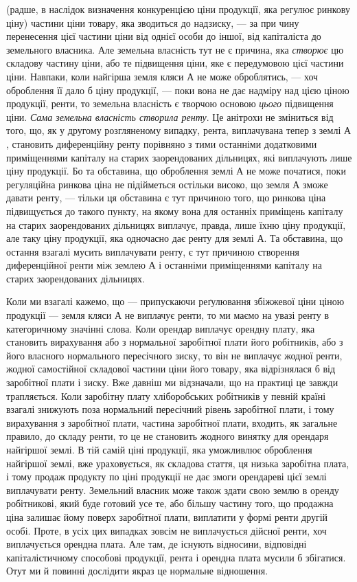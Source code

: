 \parcont{}  %
(радше, в наслідок визначення конкуренцією ціни продукції, яка регулює ринкову
ціну) частини ціни товару, яка зводиться до надзиску, — за при чину перенесення
цієї частини ціни від однієї особи до іншої, від капіталіста до
земельного власника. Але земельна власність тут не є причина, яка \emph{створює}
цю складову частину ціни, або те підвищення ціни, яке є передумовою цієї
частини ціни. Навпаки, коли найгірша земля кляси $А$ не може оброблятись, —
хоч оброблення її дало б ціну продукції, — поки вона не дає надміру над цією
ціною продукції, ренти, то земельна власність є творчою основою \emph{цього} підвищення
ціни. \emph{Сама земельна власність створила ренту}. Це анітрохи не
зміниться від того, що, як у другому розгляненому випадку, рента, виплачувана
тепер з землі $А$, становить диференційну ренту порівняно з тими останніми
додатковими приміщеннями капіталу на старих заорендованих дільницях, які
виплачують лише ціну продукції. Бо та обставина, що оброблення землі $А$
не може початися, поки регуляційна ринкова ціна не підійметься остільки високо,
що земля $А$ зможе давати ренту, — тільки ця обставина є тут причиною
того, що ринкова ціна підвищується до такого пункту, на якому вона для
останніх приміщень капіталу на старих заорендованих дільницях виплачує,
правда, лише їхню ціну продукції, але таку ціну продукції, яка одночасно
дає ренту для землі $А$. Та обставина, що остання взагалі мусить виплачувати
ренту, є тут причиною створення диференційної ренти між землею $А$ і останніми
приміщеннями капіталу на старих заорендованих дільницях.

Коли ми взагалі кажемо, що — припускаючи реґулювання збіжжевої ціни
ціною продукції — земля кляси $А$ не виплачує ренти, то ми маємо на увазі
ренту в категоричному значінні слова. Коли орендар виплачує орендну плату,
яка становить вирахування або з нормальної заробітної плати його робітників,
або з його власного нормального пересічного зиску, то він не виплачує жодної
ренти, жодної самостійної складової частини ціни його товару, яка відрізнялася б
від заробітної плати і зиску. Вже давніш ми відзначали, що на практиці це
завжди трапляється. Коли заробітну плату хліборобських робітників у певній
країні взагалі знижують поза нормальний пересічний рівень заробітної плати,
і тому вирахування з заробітної плати, частина заробітної плати, входить, як
загальне правило, до складу ренти, то це не становить жодного винятку для
орендаря найгіршої землі. В тій самій ціні продукції, яка уможливлює оброблення
найгіршої землі, вже ураховується, як складова стаття, ця низька заробітна
плата, і тому продаж продукту по ціні продукції не дає змоги орендареві
цієї землі виплачувати ренту. Земельний власник може також здати свою землю
в оренду робітникові, який буде готовий усе те, або більшу частину того, що
продажна ціна залишає йому поверх заробітної плати, виплатити у формі
ренти другій особі. Проте, в усіх цих випадках зовсім не виплачується дійсної
ренти, хоч виплачується орендна плата. Але там, де існують відносини, відповідні
капіталістичному способові продукції, рента і орендна плата мусили б
збігатися. Отут ми й повинні дослідити якраз це нормальне відношення.

